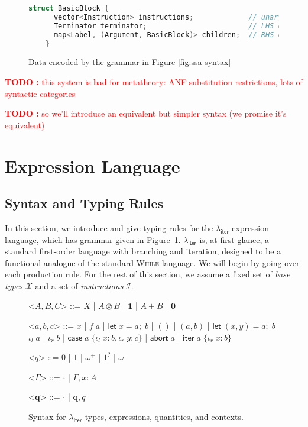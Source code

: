 \documentclass[acmsmall,screen,review]{acmart}
\newcounter{todos}
\newcommand{\TODO}[1]{{
  \stepcounter{todos}
  \begin{center}\large{\textcolor{red}{\textbf{TODO \arabic{todos}:} #1}}\end{center}
}}
\newcommand{\mc}[1]{\ensuremath{\mathcal{#1}}}
\newcommand{\mb}[1]{\ensuremath{\mathbf{#1}}}
\newcommand{\ms}[1]{\ensuremath{\mathsf{#1}}}
\newcommand{\lto}{:}
\newcommand{\linl}[1]{\iota_l\;{#1}}
\newcommand{\linr}[1]{\iota_r\;{#1}}
\newcommand{\labort}[1]{\ms{abort}\;{#1}}
\newcommand{\letexpr}[3]{\ensuremath{\ms{let}\;#1 = #2;\;#3}}
\newcommand{\caseexpr}[5]{\ms{case}\;#1\;\{\linl{#2} \lto #3, \linr{#4} \lto #5\}}
\newcommand{\liter}[3]{\ms{iter}\;#1\;\{ \linr{#2} \lto #3 \}}
\newcommand{\subiterexp}{\(\lambda_{\ms{iter}}\)}
\newcommand{\zeroq}{0}
\newcommand{\oneq}{1}
\newcommand{\delq}{1^?}
\newcommand{\cpyq}{\omega^+}
\newcommand{\topq}{\omega}
\begin{document}
\begin{figure}
  \begin{lstlisting}[language=C++]
    struct BasicBlock {
      vector<Instruction> instructions;             // unary/binary let-bindings
      Terminator terminator;                        // LHS of where-block
      map<Label, (Argument, BasicBlock)> children;  // RHS of where-block
    }
  \end{lstlisting}
  \caption{Data encoded by the grammar in Figure \ref{fig:ssa-syntax}}
  \Description{}
\end{figure}

\TODO{this system is bad for metatheory: ANF substitution restrictions, lots of syntactic
categories}

\TODO{so we'll introduce an equivalent but simpler syntax (we promise it's equivalent)}

\section{Expression Language}

\subsection{Syntax and Typing Rules}

In this section, we introduce and give typing rules for the \subiterexp{} expression language, which
has grammar given in Figure~\ref{fig:expr-syntax}. \subiterexp{} is, at first glance, a
standard first-order language with branching and iteration, designed to be a functional analogue of
the standard \textsc{While} language. We will begin by going over each production rule. For the rest
of this section, we assume a fixed set of \emph{base types} $\mc{X}$ and a set of
\emph{instructions} $\mc{I}$. 

\begin{figure}
  \begin{grammar}
    <\(A, B, C\)> ::= 
    \(X\)
    \;|\; \(A \otimes B\)
    \;|\; \(\mathbf{1}\)
    \;|\; \(A + B\)
    \;|\; \(\mathbf{0}\)

    <\(a, b, c\)> ::=
    \(x\)
    \;|\; \(f\;a\)
    \;|\; \(\letexpr{x}{a}{b}\)
    \;|\; \(()\)
    \;|\; \((a, b)\)
    \;|\; \(\letexpr{(x, y)}{a}{b}\)
    \alt  \(\linl{a}\)
    \;|\; \(\linr{b}\)
    \;|\; \(\caseexpr{a}{x}{b}{y}{c}\)
    \;|\; \(\labort{a}\)
    \;|\; \(\liter{a}{x}{b}\)
    
    <\(q\)> ::= \(\zeroq\) | \(\oneq\) | \(\cpyq\) | \(\delq\) | \(\topq\)

    <\(\Gamma\)> ::= \(\cdot\) \;|\; \(\Gamma, x : A\)

    <\(\mb{q}\)> ::= \(\cdot\) \;|\; \(\mb{q}, q\)
  \end{grammar}
  \caption{Syntax for \subiterexp{} types, expressions, quantities, and contexts.} \Description{}
  \label{fig:expr-syntax}
\end{figure}
\end{document}
